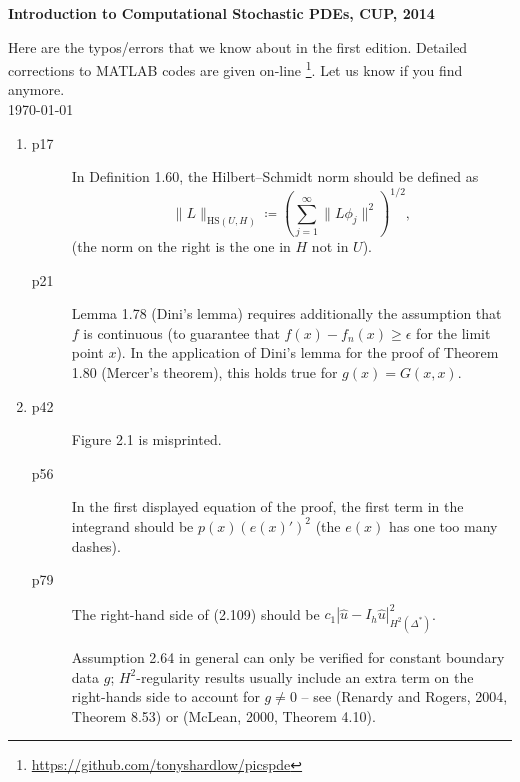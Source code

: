 \documentclass[final]{article}
\theoremstyle{definition}
\begin{document}
\begin{center}
  \textbf{\Huge Introduction to Computational Stochastic PDEs,
    CUP, 2014}\\[2ex]
\end{center}
Here are the typos/errors that we know about in the first edition.  Detailed corrections to MATLAB codes are given
on-line \footnote{\url{https://github.com/tonyshardlow/picspde}}. Let
us know if you find anymore.\\
\today

 \begin{enumerate}
 \item %
   \begin{description}
   \item[p17] In Definition 1.60, the Hilbert–Schmidt norm should be defined as
\[
\|L\|_{\mathrm{HS}(U,H)}
\coloneq 
 \left(\sum_{
j=1}
^\infty \|L\phi_j\|^2\right)^{1/2}
,
\]
(the norm on the right is the one in $H$ not in $U$).
\item[p21] Lemma 1.78 (Dini’s lemma) requires additionally the assumption that $f$ is continuous (to guarantee that
$f (x) - f_n(x) \ge\epsilon$  for the limit point $x$). In the application of Dini’s lemma for the proof of Theorem
1.80 (Mercer’s theorem), this holds true for $g(x) = G(x, x)$.

   \end{description}
 \item%
   \begin{description}
   \item[p42] Figure 2.1 is misprinted.
   \item[p56] In the first displayed equation of the proof, the first term in the integrand should be $p(x)(e(x)')^2$ (the $e(x)$ has one too many dashes).
   \item[p79] The right-hand side of (2.109) should be $c_1|\hat u - I_h\hat u|^2_{H^2(\Delta^*)}$. 
   
   Assumption 2.64 in general can only be verified for constant boundary data $g$; $H^2$-regularity results
usually include an extra term on the right-hands side to account for $g\ne 0$ -- see (Renardy and Rogers,
2004, Theorem 8.53) or (McLean, 2000, Theorem 4.10).


\end{description}
\end{enumerate}
\end{document}
